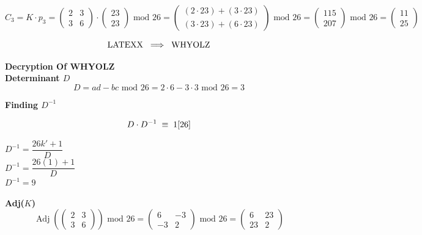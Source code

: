 \[
C_3 = K \cdot p_3 = \begin{pmatrix} 2 & 3 \\ 3 & 6 \end{pmatrix} \cdot \begin{pmatrix} 23 \\ 23
\end{pmatrix} \text{ mod } 26 = \begin{pmatrix} (2 \cdot 23) + (3 \cdot 23) \\ (3 \cdot 23) +
(6 \cdot 23) \end{pmatrix} \text{ mod } 26 = \begin{pmatrix} 115 \\ 207 \end{pmatrix}
\text{ mod } 26 = \boxed{\begin{pmatrix}11 \\ 25 \end{pmatrix}}
\]

\vspace{0.5cm}

\[\text{LATEXX} \hspace{0.2cm} \Longrightarrow \hspace{0.2cm} \text{WHYOLZ}\]

\newpage
\textbf{Decryption Of WHYOLZ}\\[0.15cm]
\textbf{Determinant \(D\)}
\[D = ad - bc \text{ mod } 26 = 2\cdot 6 - 3\cdot 3 \text{ mod } 26 =\boxed{3}\]

\textbf{Finding \(D^{-1}\)}

\[ D\cdot D^{-1} \hspace{0.1cm} \equiv \hspace{0.1cm} 1 [26]\]

\vspace{0.15cm}

\begin{center}
\(D^{-1}  = \dfrac{26k' + 1 }{D}\)\\[0.3cm]
\(D^{-1}  = \dfrac{26(1) + 1 }{D}\)\\[0.3cm]
\(\boxed{D^{-1} = 9}\)
\end{center}

\vspace{0.2cm}
\textbf{Adj(\(K\))}
\[
\operatorname{Adj}( \begin{pmatrix}
    2 & 3\\
    3 & 6
\end{pmatrix}
) \text{ mod } 26
= 
\begin{pmatrix}
    6 & -3\\
    -3 & 2
\end{pmatrix}
\text { mod } 26
= 
\boxed{ \begin{pmatrix}
        6 & 23\\
        23 & 2
\end{pmatrix} }
\]


